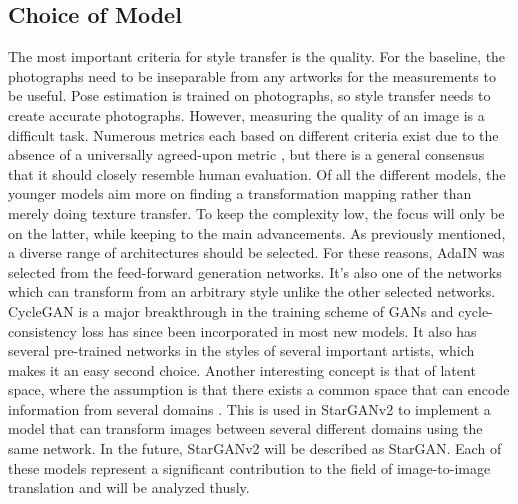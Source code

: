 \subsection{Choice of Model}
\label{sec:baseline_choice_style_transfer}
The most important criteria for style transfer is the quality.
For the baseline, the photographs need to be inseparable from any artworks for the measurements to be useful.
Pose estimation is trained on photographs, so style transfer needs to create accurate photographs.
However, measuring the quality of an image is a difficult task.
Numerous metrics each based on different criteria exist due to the absence of a universally agreed-upon metric \cite{ioannou2024}, but there is a general consensus that it should closely resemble human evaluation.
Of all the different models, the younger models aim more on finding a transformation mapping rather than merely doing texture transfer.
To keep the complexity low, the focus will only be on the latter, while keeping to the main advancements.
As previously mentioned, a diverse range of architectures should be selected.
For these reasons, \gls{AdaIN} \cite{Huang2017} was selected from the feed-forward generation networks.
It's also one of the networks which can transform from an arbitrary style unlike the other selected networks.
CycleGAN \cite{Zhu2017b} is a major breakthrough in the training scheme of \glspl{GAN} and cycle-consistency loss has since been incorporated in most new models.
It also has several pre-trained networks in the styles of several important artists, which makes it an easy second choice.
Another interesting concept is that of latent space, where the assumption is that there exists a common space that can encode information from several domains \cite{Liu2017}.
This is used in StarGANv2 \cite{Choi2019} to implement a model that can transform images between several different domains using the same network.
In the future, StarGANv2 will be described as StarGAN.
Each of these models represent a significant contribution to the field of image-to-image translation and will be analyzed thusly.
\\

